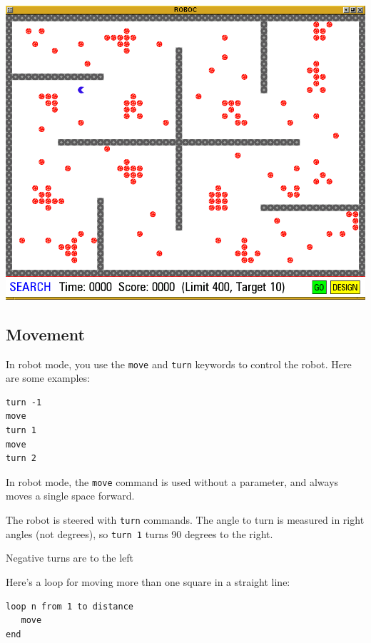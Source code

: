 \documentclass[12pt,a4paper,twoside]{article}
\renewcommand{\_}{\texttt{\symbol{95}}}
\begin{document}
\begin{center}
\includegraphics[scale=0.6,angle=0]{screenshots/robot/search}
\end{center}

\subsection{Movement}

In robot mode, you use the \verb^move^ and \verb^turn^
keywords to control the robot. Here are some examples:

\begin{verbatim}
turn -1
move
turn 1
move
turn 2
\end{verbatim}

\begin{bulletlist}
\item In robot mode, the \verb^move^ command is used without a
	parameter, and always moves a single space forward.
\item The robot is steered with \verb^turn^ commands. 
	The angle to turn is measured in right angles (not degrees),
	so \texttt{turn 1} turns 90 degrees to the right.
\item Negative turns are to the left
\end{bulletlist}

Here's a loop for moving more than one square
in a straight line:

\begin{verbatim}
loop n from 1 to distance
   move
end
\end{verbatim}
\end{document}
